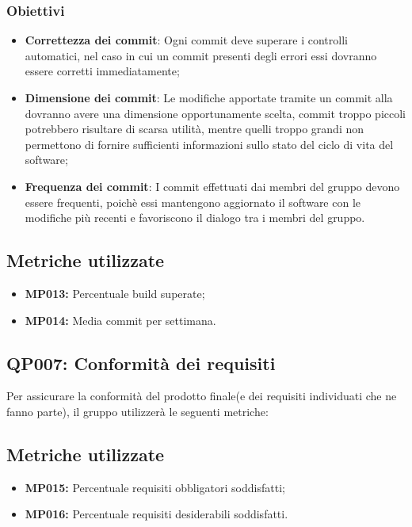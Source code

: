 \subsubsection{Obiettivi}
\begin{itemize}
	\item \textbf{Correttezza dei commit}: Ogni commit deve superare i controlli automatici, nel caso in cui un commit presenti degli errori  essi dovranno essere corretti immediatamente;
	\item \textbf{Dimensione dei commit}: Le modifiche apportate tramite un commit alla  dovranno avere una dimensione opportunamente scelta, commit troppo piccoli potrebbero risultare di scarsa utilità, mentre quelli troppo grandi non permettono di fornire sufficienti informazioni sullo stato del ciclo di vita del software;
	\item  \textbf{Frequenza dei commit}: I commit effettuati dai membri del gruppo devono essere frequenti, poichè essi mantengono aggiornato il software con le modifiche più recenti e favoriscono il dialogo tra i membri del gruppo.
	
\end{itemize}
\subsection{Metriche utilizzate}
\begin{itemize}
	\item \textbf{MP013:} Percentuale build superate;
	\item \textbf{MP014:} Media commit per settimana.
\end{itemize}

\subsection{QP007: Conformità dei requisiti}
Per assicurare la conformità del prodotto finale(e dei requisiti individuati che ne fanno parte), il gruppo utilizzerà le seguenti metriche:

\subsection{Metriche utilizzate}
\begin{itemize}
	\item \textbf{MP015:} Percentuale requisiti obbligatori soddisfatti;
	\item \textbf{MP016:} Percentuale requisiti desiderabili soddisfatti.
\end{itemize}

